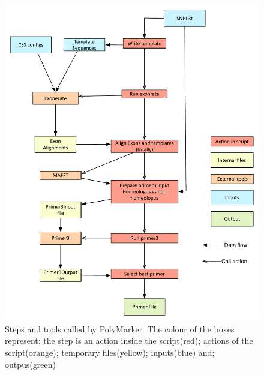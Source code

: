 \begin{figure}
\includegraphics[width=1\textwidth]{PolyMarker/Figures/pipeline.pdf}
        \caption{Steps and tools called by PolyMarker. The colour of the boxes represent: the step is an action inside the script(red); actions of the script(orange); temporary files(yellow); inputs(blue) and; outpus(green)}
        \label{fig:poly:pipeline}
\end{figure}




